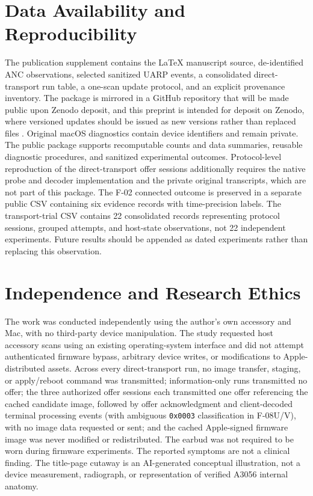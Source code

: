 \documentclass[11pt,letterpaper]{article}
\begin{document}
\section*{Data Availability and Reproducibility}
The publication supplement contains the LaTeX manuscript source, de-identified ANC observations, selected sanitized UARP events, a consolidated direct-transport run table, a one-scan update protocol, and an explicit provenance inventory. The package is mirrored in a GitHub repository that will be made public upon Zenodo deposit, and this preprint is intended for deposit on Zenodo, where versioned updates should be issued as new versions rather than replaced files \cite{zenodoversion}. Original macOS diagnostics contain device identifiers and remain private. The public package supports recomputable counts and data summaries, reusable diagnostic procedures, and sanitized experimental outcomes. Protocol-level reproduction of the direct-transport offer sessions additionally requires the native probe and decoder implementation and the private original transcripts, which are not part of this package. The F-02 connected outcome is preserved in a separate public CSV containing six evidence records with time-precision labels. The transport-trial CSV contains 22 consolidated records representing protocol sessions, grouped attempts, and host-state observations, not 22 independent experiments. Future results should be appended as dated experiments rather than replacing this observation.

\section*{Independence and Research Ethics}
The work was conducted independently using the author's own accessory and Mac, with no third-party device manipulation. The study requested host accessory scans using an existing operating-system interface and did not attempt authenticated firmware bypass, arbitrary device writes, or modifications to Apple-distributed assets. Across every direct-transport run, no image transfer, staging, or apply/reboot command was transmitted; information-only runs transmitted no offer; the three authorized offer sessions each transmitted one offer referencing the cached candidate image, followed by offer acknowledgment and client-decoded terminal processing events (with ambiguous \texttt{0x0003} classification in F-08U/V), with no image data requested or sent; and the cached Apple-signed firmware image was never modified or redistributed. The earbud was not required to be worn during firmware experiments. The reported symptoms are not a clinical finding. The title-page cutaway is an AI-generated conceptual illustration, not a device measurement, radiograph, or representation of verified A3056 internal anatomy.
\end{document}
